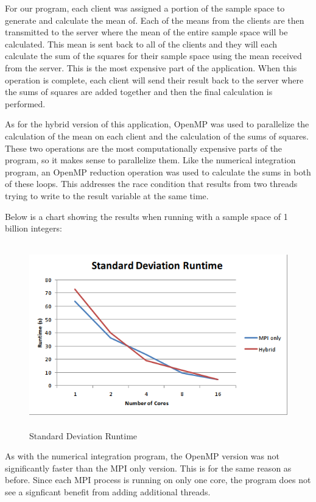 \documentclass[notitlepage, letterpaper, 12pt]{report}
\begin{document}
For our program, each client was assigned a portion of the sample space to generate and calculate the mean of. Each of the means from the clients are then
transmitted to the server where the mean of the entire sample space will be calculated. This mean is sent back to all of the clients and they will each
calculate the sum of the squares for their sample space using the mean received from the server. 
This is the most expensive part of the application. When this operation is complete, each client will
send their result back to the server where the sums of squares are added together and then the final calculation is performed. 

As for the hybrid version of this application, OpenMP was used to parallelize the calculation of the mean on each client and the calculation of the sums of squares. 
These two operations are the most computationally expensive parts of the program, so it makes sense to parallelize them. Like the numerical integration program, an
OpenMP reduction operation was used to calculate the sums in both of these loops. This addresses the race condition that results from two threads trying to write to the
result variable at the same time.

Below is a chart showing the results when running with a sample space of 1 billion integers:

\begin{figure}[H]
	\includegraphics[width=\linewidth,height=8cm,keepaspectratio]{q3.png}
	\caption[Standard Deviation Runtime]{Standard Deviation Runtime}
	\label{fig:arch}
\end{figure}

As with the numerical integration program, the OpenMP version was not significantly faster than the MPI only version. This is for the same reason as before. Since each MPI process
is running on only one core, the program does not see a signficant benefit from adding additional threads.  
\end{document}
